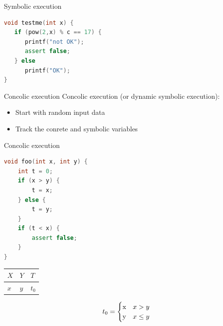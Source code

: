 \documentclass{beamer}
\begin{document}
\begin{frame}[fragile]{Symbolic execution}
\begin{minipage}{0.49\textwidth}
\begin{lstlisting}[language=C++]
void testme(int x) {
   if (pow(2,x) % c == 17) {
      printf("not OK");
      assert false;
   } else
      printf("OK");
}
\end{lstlisting}
\end{minipage}
\end{frame}


\begin{frame}[fragile]{Concolic execution}
Concolic execution (or dynamic symbolic execution):
\begin{itemize}
\item Start with random input data
\item Track the conrete and symbolic variables
\end{itemize}
\end{frame}

\begin{frame}[fragile]{Concolic execution}
\begin{minipage}{0.49\textwidth}
\begin{lstlisting}[language=C++,escapechar=@]
void foo(int x, int y) {
    int t = 0;
    if (x > y) {
        t = x;
    } else {
        t = y;
    }
    if (t < x) {
        assert false;
    }
}
\end{lstlisting}
\end{minipage}
\hfill
\begin{minipage}{0.49\textwidth}
\begin{center}
\begin{tabular}{ | l | l | l | }
\hline
$X$ & $Y$ & $T$ \\
\hline
$x$ & $y$ & $t_0$ \\
\hline
\end{tabular}
\begin{equation*}
t_0 =
    \begin{cases}
    $x$ &\text{$x > y$}\\
    $y$ &\text{$x \le y$}
    \end{cases}
\end{equation*}
\end{center}
\end{minipage}
\end{frame}
\end{document}
